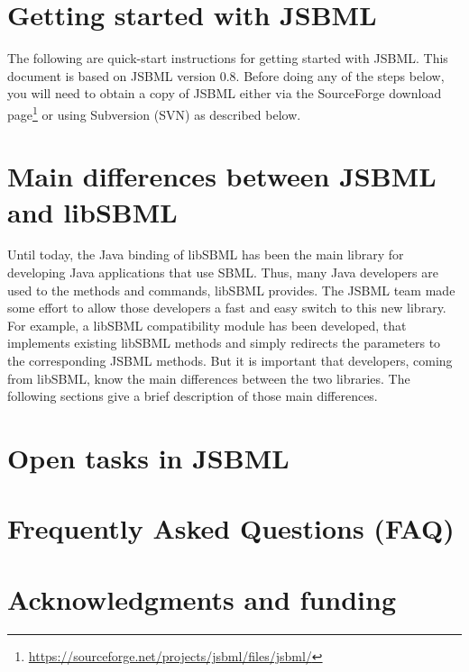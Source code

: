 \documentclass[
  BCOR12mm,
  letterpaper,
  11pt,
  headsepline,
  numbers=noenddot,
  caption=oneline,
  headinclude,
  appendixprefix,
  index=totoc,
  bibliography=totoc,
  twoside,
  titlepage
]{scrreprt}
\begin{document}
\tableofcontents

\chapter{Getting started with JSBML}

The following are quick-start instructions for getting started with JSBML. This
document is based on JSBML version 0.8. Before doing any of the steps below,
you will need to obtain a copy of JSBML either via the SourceForge download
page\footnote{\url{https://sourceforge.net/projects/jsbml/files/jsbml/}} or using
Subversion (SVN) as described below.





\chapter{Main differences between JSBML and libSBML}

Until today, the Java binding of libSBML has been the main library for
developing Java applications that use SBML. Thus, many Java developers are used
to the methods and commands, libSBML provides. The JSBML team made some effort
to allow those developers a fast and easy switch to this new library. For
example, a libSBML compatibility module has been developed, that implements
existing libSBML methods and simply redirects the parameters to the
corresponding JSBML methods. But it is important that developers, coming from
libSBML, know the main differences between the two libraries. The following
sections give a brief description of those main differences.



\chapter{Open tasks in JSBML}



\appendix

\chapter{Frequently Asked Questions (FAQ)}


\chapter{Acknowledgments and funding}






\printindex
\end{document}
